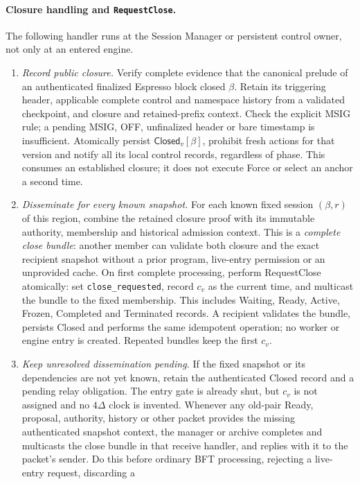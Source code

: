 \documentclass[11pt,a4paper]{article}
\newcommand{\tagg}[1]{\ensuremath{\mathsf{#1}}}
\newcommand{\defterm}[1]{\textcolor{rrBlue}{\textit{#1}}}
\begin{document}
\paragraph{Closure handling and \texttt{RequestClose}.}
The following handler runs at the Session Manager or persistent control owner,
not only at an entered engine.
\begin{enumerate}[label=(\roman*),itemsep=2pt]
\item \emph{Record public closure.} Verify complete evidence that the
canonical prelude of an authenticated finalized Espresso block closed
$\beta$. Retain its triggering header, applicable complete control and
namespace history from a validated checkpoint, and closure and
retained-prefix context. Check the explicit MSIG rule; a pending
MSIG, OFF, unfinalized header or bare timestamp is insufficient.
Atomically persist $\tagg{Closed}_v[\beta]$, prohibit fresh actions for
that version and notify all its local control records, regardless of
phase. This consumes an established closure; it does not execute Force
or select an anchor a second time.
\item \emph{Disseminate for every known snapshot.} For each known fixed
session $(\beta,r)$ of this region, combine the retained closure proof
with its immutable authority, membership and historical admission
context. This is a \defterm{complete close bundle}: another member can
validate both closure and the exact recipient snapshot without a prior
program, live-entry permission or an unprovided cache. On first complete
processing, perform RequestClose atomically: set
\texttt{close\_requested}, record $c_v$ as the current time, and multicast
the bundle to the fixed membership. This includes Waiting, Ready,
Active, Frozen, Completed and Terminated records. A recipient validates
the bundle, persists Closed and performs the same idempotent operation;
no worker or engine entry is created. Repeated bundles keep the first $c_v$.
\item \emph{Keep unresolved dissemination pending.} If the fixed snapshot or
its dependencies are not yet known, retain the authenticated Closed
record and a pending relay obligation. The entry gate is already shut,
but $c_v$ is not assigned and no $4\Delta$ clock is invented.
Whenever any old-pair Ready, proposal, authority, history or other packet
provides the missing authenticated snapshot context, the manager or
archive completes and multicasts the close bundle in that receive
handler, and replies with it to the packet's sender. Do this before
ordinary BFT processing, rejecting a live-entry request, discarding a

\end{enumerate}
\end{document}

